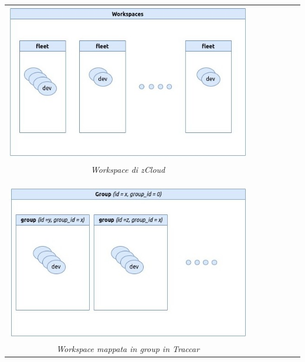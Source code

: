 \documentclass[a4paper,titlepage,12pt]{book}
\begin{document}
\begin{center}
\begin{tabular}{c c c cc c c}


\includegraphics[scale=0.6]{images/wks.jpg}\\ 
\textit{Workspace di zCloud}\\
\\
\\
\\
\includegraphics[scale=0.6]{images/groups.jpg} \\
\textit{Workspace mappata in group in Traccar}

\end{tabular}
\end{center}
\end{document}
